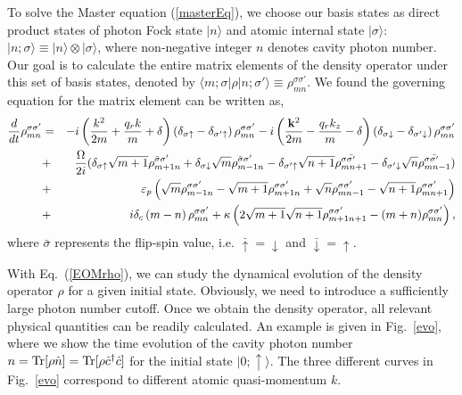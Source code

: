 \documentclass[atoms,article,submit,moreauthors,pdftex,12pt,a4paper]{mdpi}
\def\ba{\begin{eqnarray}}
\def\ea{\end{eqnarray}}
\begin{document}
To solve the Master equation (\ref{masterEq}), we choose our basis states as direct product states of photon Fock state $|n \rangle$ and atomic internal state $|\sigma \rangle$: $|n;\sigma\rangle \equiv |n \rangle \otimes |\sigma \rangle$, %
where non-negative integer $n$ denotes cavity photon number. Our goal is to calculate the entire matrix elements of the density operator under this set of basis states, denoted by $\langle m;\sigma|\rho|n;\sigma'\rangle\equiv\rho_{mn}^{\sigma\sigma'}$. We found the governing equation for the matrix element can be written as,
\ba 
\frac{d}{dt}\rho_{mn}^{\sigma\sigma'} 
& = & -i\left(\frac{{k}^{2}}{2m}+\frac{q_{r}k}{m}+ \delta\right)\left(\delta_{\sigma\uparrow}-\delta_{\sigma'\uparrow}\right)\rho_{mn}^{\sigma\sigma'}
-  i\left(\frac{{\bf k}^{2}}{2m}-\frac{q_{r}k_{z}}{m}-\delta\right)\left(\delta_{\sigma\downarrow}-\delta_{\sigma'\downarrow}\right)\rho_{mn}^{\sigma\sigma'}\nonumber\\
& + & \frac{\Omega}{2i}(\delta_{\sigma\uparrow}\sqrt{m+1}\rho_{m+1n}^{\bar{\sigma}\sigma'}
+\delta_{\sigma\downarrow}\sqrt{m}\rho_{m-1n}^{\bar{\sigma}\sigma'}
-\delta_{\sigma'\uparrow}\sqrt{n+1}\rho_{mn+1}^{\sigma\bar{\sigma'}}
-\delta_{\sigma'\downarrow}\sqrt{n}\rho_{mn-1}^{\sigma\bar{\sigma'}})\nonumber\\
& + & \varepsilon_{p}\left(\sqrt{m}\rho_{m-1n}^{\sigma\sigma'}-\sqrt{m+1}\rho_{m+1n}^{\sigma\sigma'}+\sqrt{n}\rho_{mn-1}^{\sigma\sigma'}-\sqrt{n+1}\rho_{mn+1}^{\sigma\sigma'}\right)\nonumber\\
& + & i\delta_{c}\left(m-n\right)\rho_{mn}^{\sigma\sigma'}
+ \kappa\left(2\sqrt{m+1}\sqrt{n+1}\rho_{m+1n+1}^{\sigma\sigma'}-(m+n)\rho_{mn}^{\sigma\sigma'}\right),\label{EOMrho}
\ea
where $\bar{\sigma}$ represents the flip-spin value, i.e. $\bar{\uparrow}=\downarrow$ and $\bar{\downarrow}=\uparrow$. 

With Eq.~(\ref{EOMrho}), we can study the dynamical evolution of the density operator $\rho$ for a given initial state. Obviously, we need to introduce a sufficiently large photon number cutoff. Once we obtain the density operator, all relevant physical quantities can be readily calculated. An example is given in Fig.~\ref{evo}, where we show the time evolution of the cavity photon number $n = {\rm Tr}[\rho \hat{n}]= {\rm Tr}[\rho \hat{c}^\dag \hat{c}]$ for the initial state $|0; \uparrow \rangle$. The three different curves in Fig.~\ref{evo} correspond to different atomic quasi-momentum $k$. 
\end{document}
